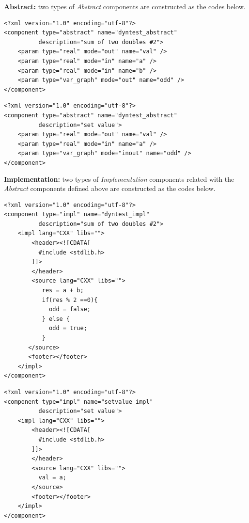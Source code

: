 \textbf{Abstract:} two types of \textit{Abstract} components are constructed as the codes below. 

\vspace{0.2in}
\lstset{language=XML}
\begin{lstlisting}[frame=single]
<?xml version="1.0" encoding="utf-8"?>
<component type="abstract" name="dyntest_abstract"
          description="sum of two doubles #2">
    <param type="real" mode="out" name="val" />
    <param type="real" mode="in" name="a" />
    <param type="real" mode="in" name="b" />
    <param type="var_graph" mode="out" name="odd" /> 
</component>
\end{lstlisting}

\vspace{0.2in}

\lstset{language=XML}
\begin{lstlisting}[frame=single]
<?xml version="1.0" encoding="utf-8"?>
<component type="abstract" name="dyntest_abstract"
          description="set value">
    <param type="real" mode="out" name="val" />
    <param type="real" mode="in" name="a" />
    <param type="var_graph" mode="inout" name="odd" /> 
</component>
\end{lstlisting}

\textbf{Implementation:} two types of \textit{Implementation} components related with the \textit{Abstract} components defined above are constructed as the codes below. 

\vspace{0.2in}
\lstset{language=XML}
\begin{lstlisting}[frame=single]
<?xml version="1.0" encoding="utf-8"?>
<component type="impl" name="dyntest_impl"
          description="sum of two doubles #2">
    <impl lang="CXX" libs="">
        <header><![CDATA[
          #include <stdlib.h>
        ]]>
        </header>
        <source lang="CXX" libs="">
           res = a + b;
           if(res % 2 ==0){
             odd = false;
           } else {
             odd = true;
           }
       </source>
       <footer></footer>
    </impl>
</component>
\end{lstlisting}

\vspace{0.2in}
\lstset{language=XML}
\begin{lstlisting}[frame=single]
<?xml version="1.0" encoding="utf-8"?>
<component type="impl" name="setvalue_impl"
          description="set value">
    <impl lang="CXX" libs="">
        <header><![CDATA[
          #include <stdlib.h>
        ]]>
        </header>
        <source lang="CXX" libs="">
          val = a;
        </source>
        <footer></footer>
    </impl>
</component>
\end{lstlisting}

